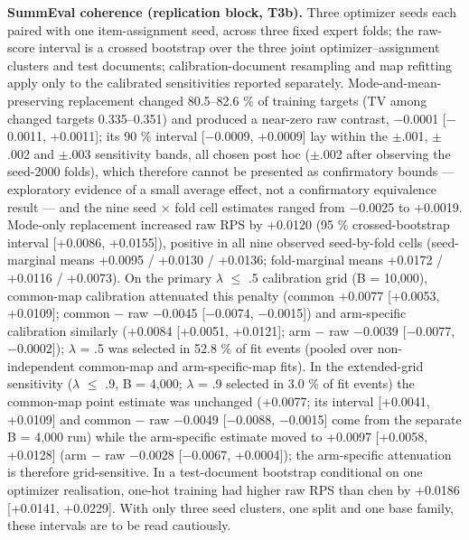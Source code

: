 \documentclass[10pt]{article}
\begin{document}
\textbf{SummEval coherence (replication block, T3b).} Three optimizer seeds each paired with one item-assignment seed, across three fixed expert folds; the raw-score interval is a crossed bootstrap over the three joint optimizer--assignment clusters and test documents; calibration-document resampling and map refitting apply only to the calibrated sensitivities reported separately. Mode-and-mean-preserving replacement changed 80.5--82.6 \% of training targets (TV among changed targets 0.335--0.351) and produced a near-zero raw contrast, $-$0.0001 {[}$-$0.0011, +0.0011{]}; its 90 \% interval {[}$-$0.0009, +0.0009{]} lay within the $\pm$.001, $\pm$.002 and $\pm$.003 sensitivity bands, all chosen post hoc ($\pm$.002 after observing the seed-2000 folds), which therefore cannot be presented as confirmatory bounds --- exploratory evidence of a small average effect, not a confirmatory equivalence result --- and the nine seed $\times$ fold cell estimates ranged from $-$0.0025 to +0.0019. Mode-only replacement increased raw RPS by +0.0120 (95 \% crossed-bootstrap interval {[}+0.0086, +0.0155{]}), positive in all nine observed seed-by-fold cells (seed-marginal means +0.0095 / +0.0130 / +0.0136; fold-marginal means +0.0172 / +0.0116 / +0.0073). On the primary $\lambda$ $\leq$ .5 calibration grid (B = 10,000), common-map calibration attenuated this penalty (common +0.0077 {[}+0.0053, +0.0109{]}; common $-$ raw $-$0.0045 {[}$-$0.0074, $-$0.0015{]}) and arm-specific calibration similarly (+0.0084 {[}+0.0051, +0.0121{]}; arm $-$ raw $-$0.0039 {[}$-$0.0077, $-$0.0002{]}); $\lambda$ = .5 was selected in 52.8 \% of fit events (pooled over non-independent common-map and arm-specific-map fits). In the extended-grid sensitivity ($\lambda$ $\leq$ .9, B = 4,000; $\lambda$ = .9 selected in 3.0 \% of fit events) the common-map point estimate was unchanged (+0.0077; its interval {[}+0.0041, +0.0109{]} and common $-$ raw $-$0.0049 {[}$-$0.0088, $-$0.0015{]} come from the separate B = 4,000 run) while the arm-specific estimate moved to +0.0097 {[}+0.0058, +0.0128{]} (arm $-$ raw $-$0.0028 {[}$-$0.0067, +0.0004{]}); the arm-specific attenuation is therefore grid-sensitive. In a test-document bootstrap conditional on one optimizer realisation, one-hot training had higher raw RPS than chen by +0.0186 {[}+0.0141, +0.0229{]}. With only three seed clusters, one split and one base family, these intervals are to be read cautiously.
\end{document}

